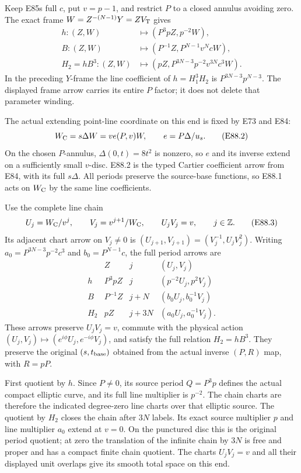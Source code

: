 \par\nobreak

Keep E85\textquotesingle s full \(c\), put \(v=p-1\), and restrict \(P\)
to a closed annulus avoiding zero. The exact frame
\(W=Z^{-(N-1)}Y=ZV_{\rm T}\) gives
\[
\begin{aligned}
 h:(Z,W)&\mapsto(P^3pZ,p^{-2}W),\\
 B:(Z,W)&\mapsto(P^{-1}Z,P^{N-1}v^N cW),\\
 H_2=hB^3:(Z,W)&\mapsto(pZ,
             P^{3N-3}p^{-2}v^{3N}c^3W).
\end{aligned}                                                \tag{E88.1}
\]
In the preceding \(Y\)-frame the line coefficient of
\(h=H_1^3H_2\) is \(P^{3N-3}p^{N-3}\). The displayed
frame arrow carries its entire \(P\) factor; it does
not delete that parameter winding.

The actual extending point-line coordinate on this
end is fixed by E73 and E84:
\[
 W_{\rm C}=s\Delta W
          =v e(P,v)W,
 \qquad e=P\Delta/u_s .                          \tag{E88.2}
\]
On the chosen \(P\)-annulus, \(\Delta(0,t)=8t^2\) is
nonzero, so \(e\) and its inverse extend on a sufficiently
small \(v\)-disc. E88.2 is the typed Cartier coefficient
arrow from E84, with its full \(s\Delta\). All periods
preserve the source-base functions, so E88.1 acts on
\(W_{\rm C}\) by the same line coefficients.

Use the complete line chain
\[
 U_j=W_{\rm C}/v^j,\qquad
 V_j=v^{j+1}/W_{\rm C},\qquad U_jV_j=v,
 \qquad j\in\mathbb Z.                          \tag{E88.3}
\]
Its adjacent chart arrow on \(V_j\ne0\) is
\((U_{j+1},V_{j+1})=(V_j^{-1},U_jV_j^2)\).
Writing \(a_0=P^{3N-3}p^{-2}c^3\) and
\(b_0=P^{N-1}c\), the full period arrows are
\[
\begin{array}{c|c|c|c}
 &Z&j&(U_j,V_j)\\ \hline
 h&P^3pZ&j&(p^{-2}U_j,p^2V_j)\\
 B&P^{-1}Z&j+N&(b_0U_j,b_0^{-1}V_j)\\
 H_2&pZ&j+3N&(a_0U_j,a_0^{-1}V_j).
\end{array}                                                \tag{E88.4}
\]
These arrows preserve \(U_jV_j=v\), commute with the
physical action \((U_j,V_j)\mapsto(e^{i\phi}U_j,e^{-i\phi}V_j)\),
and satisfy the full relation \(H_2=hB^3\).
They preserve the original \((s,t_{\rm base})\) obtained
from the actual inverse \((P,R)\) map, with \(R=pP\).

First quotient by \(h\). Since \(P\ne0\), its source
period \(Q=P^3p\) defines the actual compact elliptic
curve, and its full line multiplier is \(p^{-2}\).
The chain charts are therefore the indicated degree-zero
line charts over that elliptic source. The quotient by
\(H_2\) closes the chain after \(3N\) labels. Its exact
source multiplier \(p\) and line multiplier \(a_0\)
extend at \(v=0\). On the punctured disc this is the
original period quotient; at zero the translation of
the infinite chain by \(3N\) is free and proper and has
a compact finite chain quotient. The charts
\(U_jV_j=v\) and all their displayed unit overlaps
give its smooth total space on this end.

